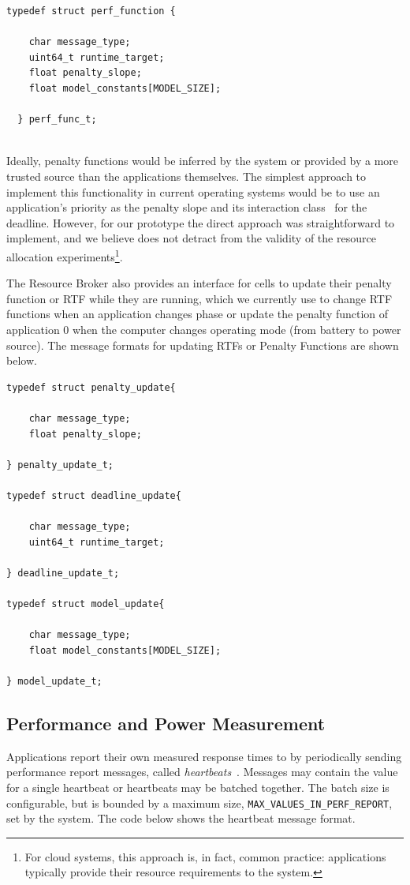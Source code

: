 \begin{lstlisting}
typedef struct perf_function {

    char message_type;
    uint64_t runtime_target;
    float penalty_slope;
    float model_constants[MODEL_SIZE];

  } perf_func_t;  
                                                             
\end{lstlisting}

Ideally, penalty functions would be inferred by the system or provided by a
more trusted source than the applications themselves.  The simplest approach to implement this functionality in current operating systems would be to use an application's priority as the penalty slope and its interaction class~\cite{interaction_class} for the deadline. However, for our prototype the direct approach was straightforward to implement, and we believe does not detract from the validity of the resource allocation experiments\footnote{For cloud systems, this approach is, in fact, common practice: applications typically provide their resource requirements to the system.}.  


The Resource Broker also provides an interface for cells to update their penalty function or RTF while they are running, which we currently use to change RTF functions when an application changes phase or update the penalty function of application 0 when the computer changes operating mode (\ie from battery to power source).  The message formats for updating RTFs or Penalty Functions are shown below. 

\begin{lstlisting}
typedef struct penalty_update{

    char message_type;
    float penalty_slope;

} penalty_update_t;

typedef struct deadline_update{

    char message_type;
    uint64_t runtime_target;

} deadline_update_t;

typedef struct model_update{

    char message_type;
    float model_constants[MODEL_SIZE];

} model_update_t;
\end{lstlisting}

\subsection{Performance and Power Measurement}
Applications report their own measured response times to \pacora by periodically sending performance report messages, called \emph{heartbeats}~\cite{hoffmann2011}.  Messages may contain the value for a single heartbeat or heartbeats may be batched together.  The batch size is configurable, but is bounded by a maximum size, \texttt{MAX\_VALUES\_IN\_PERF\_REPORT}, set by the system.   The code below shows the heartbeat message format.

